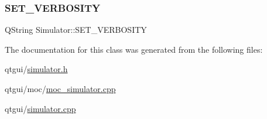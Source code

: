 \mbox{\label{class_simulator_aea6554545aab8c31486e9c883de8346d}} 
\subsubsection{\texorpdfstring{SET\_VERBOSITY}{SET\_VERBOSITY}}
{\footnotesize\ttfamily Q\+String Simulator\+::\+S\+E\+T\+\_\+\+V\+E\+R\+B\+O\+S\+I\+TY\hspace{0.3cm}{\ttfamily [static]}}



The documentation for this class was generated from the following files\+:\begin{DoxyCompactItemize}
\item 
qtgui/\mbox{\hyperlink{simulator_8h}{simulator.\+h}}\item 
qtgui/moc/\mbox{\hyperlink{moc__simulator_8cpp}{moc\+\_\+simulator.\+cpp}}\item 
qtgui/\mbox{\hyperlink{simulator_8cpp}{simulator.\+cpp}}\end{DoxyCompactItemize}
